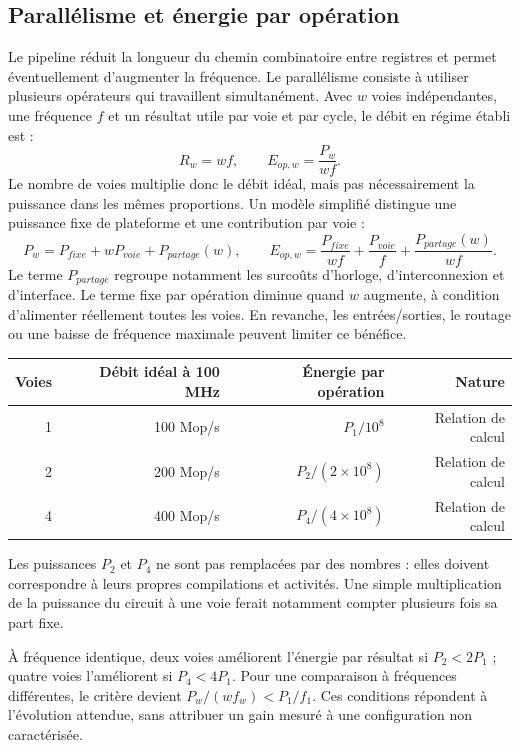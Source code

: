 \documentclass[11pt,a4paper]{article}
\begin{document}
\newpage
\subsection{Parallélisme et énergie par opération}
Le pipeline réduit la longueur du chemin combinatoire entre registres et permet éventuellement d'augmenter la fréquence. Le parallélisme consiste à utiliser plusieurs opérateurs qui travaillent simultanément. Avec $w$ voies indépendantes, une fréquence $f$ et un résultat utile par voie et par cycle, le débit en régime établi est :
\[
 R_w=w f,\qquad E_{op,w}=\frac{P_w}{w f}.
\]
Le nombre de voies multiplie donc le débit idéal, mais pas nécessairement la puissance dans les mêmes proportions. Un modèle simplifié distingue une puissance fixe de plateforme et une contribution par voie :
\[
 P_w=P_{fixe}+wP_{voie}+P_{partage}(w),\qquad
 E_{op,w}=\frac{P_{fixe}}{w f}+\frac{P_{voie}}{f}
            +\frac{P_{partage}(w)}{w f}.
\]
Le terme $P_{partage}$ regroupe notamment les surcoûts d'horloge, d'interconnexion et d'interface. Le terme fixe par opération diminue quand $w$ augmente, à condition d'alimenter réellement toutes les voies. En revanche, les entrées/sorties, le routage ou une baisse de fréquence maximale peuvent limiter ce bénéfice.

\begin{center}
\begin{tabular}{@{}rrrr@{}}
\toprule
Voies & Débit idéal à 100 MHz & Énergie par opération & Nature\\
\midrule
1 & 100 Mop/s & $P_1/10^8$ & Relation de calcul\\
2 & 200 Mop/s & $P_2/(2\times10^8)$ & Relation de calcul\\
4 & 400 Mop/s & $P_4/(4\times10^8)$ & Relation de calcul\\
\bottomrule
\end{tabular}
\end{center}
Les puissances $P_2$ et $P_4$ ne sont pas remplacées par des nombres : elles doivent correspondre à leurs propres compilations et activités. Une simple multiplication de la puissance du circuit à une voie ferait notamment compter plusieurs fois sa part fixe.

À fréquence identique, deux voies améliorent l'énergie par résultat si $P_2<2P_1$ ; quatre voies l'améliorent si $P_4<4P_1$. Pour une comparaison à fréquences différentes, le critère devient $P_w/(w f_w)<P_1/f_1$. Ces conditions répondent à l'évolution attendue, sans attribuer un gain mesuré à une configuration non caractérisée.
\end{document}
